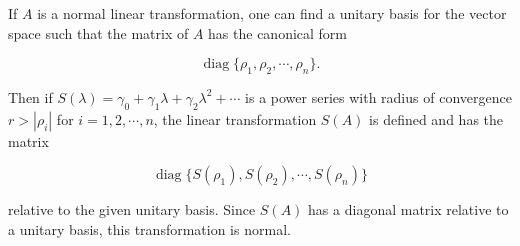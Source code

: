 If $A$ is a normal linear transformation, one can find a unitary basis for the vector space such that the matrix of $A$ has the canonical form

$$\operatorname{diag}\{ \rho_1, \rho_2, \cdots, \rho_n \}.$$

Then if $S(\lambda) = \gamma_0 + \gamma_1\lambda + \gamma_2\lambda^2 + \cdots$ is a power series with radius of convergence $r > |\rho_i|$ for $i = 1, 2, \cdots, n$, the linear transformation $S(A)$ is defined and has the matrix

$$\operatorname{diag}\{S(\rho_1), S(\rho_2), \cdots, S(\rho_n)\}$$

relative to the given unitary basis. Since $S(A)$ has a diagonal matrix relative to a unitary basis, this transformation is normal.
